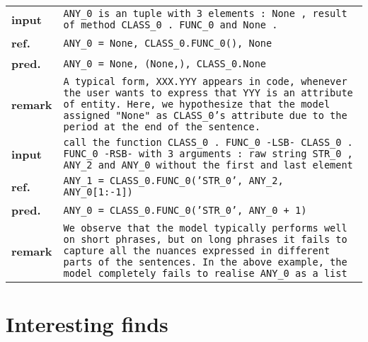 \documentclass{article}
\begin{document}
  \begin{tabular}{ l p{}}
    \hline
		\textbf{input} & \texttt{ANY\_0 is an tuple with 3 elements : None , result of method 
                     CLASS\_0 . FUNC\_0 and None .} \\
    \textbf{ref.}  & \texttt{ANY\_0 = None, CLASS\_0.FUNC\_0(), None} \\
    \textbf{pred.} & \texttt{ANY\_0 = None, (None,), CLASS\_0.None} \\
    \textbf{remark}& \texttt{A typical form, XXX.YYY appears in code, whenever the user wants to 
                     express that YYY is an attribute of entity. Here, we hypothesize that the 
                     model assigned "None" as CLASS\_0's attribute due to the period at the end 
                     of the sentence.} \\
    \hline
		\textbf{input} & \texttt{call the function CLASS\_0 . FUNC\_0 -LSB- CLASS\_0 . FUNC\_0 -RSB- 
                     with 3 arguments : raw string STR\_0 , ANY\_2 and ANY\_0 without the first 
                     and last element} \\
    \textbf{ref.}  & \texttt{ANY\_1 = CLASS\_0.FUNC\_0('STR\_0', ANY\_2, ANY\_0[1:-1])} \\
    \textbf{pred.} & \texttt{ANY\_0 = CLASS\_0.FUNC\_0('STR\_0', ANY\_0 + 1)} \\ 
    \textbf{remark}& \texttt{We observe that the model typically performs well on short phrases, 
                     but on long phrases it fails to capture all the nuances expressed in 
                     different parts of the sentences. In the above example, the model 
                     completely fails to realise ANY\_0 as a list} \\
    \hline
  \end{tabular}

  \section{Interesting finds}
\end{document}
